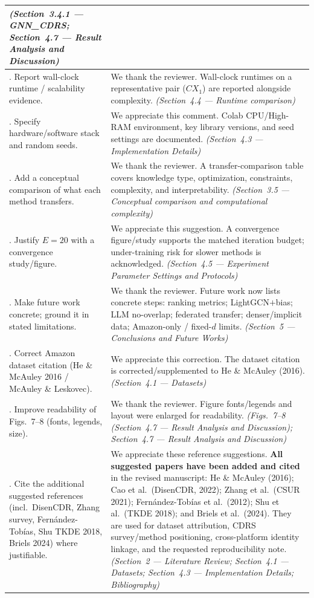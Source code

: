 \documentclass[11pt,a4paper]{article}
\begin{document}
{\begin{longtable}{@{}>{\raggedright\arraybackslash}p{}|>{\raggedright\arraybackslash}p{}@{}}
\textit{(Section~3.4.1 --- GNN\_CDRS; Section~4.7 --- Result Analysis and Discussion)} \\
\midrule
16. Report wall-clock runtime / scalability evidence.
&
We thank the reviewer. Wall-clock runtimes on a representative pair ($CX_1$) are reported alongside complexity.
\textit{(Section~4.4 --- Runtime comparison)} \\
\midrule
17. Specify hardware/software stack and random seeds.
&
We appreciate this comment. Colab CPU/High-RAM environment, key library versions, and seed settings are documented.
\textit{(Section~4.3 --- Implementation Details)} \\
\midrule
18. Add a conceptual comparison of what each method transfers.
&
We thank the reviewer. A transfer-comparison table covers knowledge type, optimization, constraints, complexity, and interpretability.
\textit{(Section~3.5 --- Conceptual comparison and computational complexity)} \\
\midrule
19. Justify $E{=}20$ with a convergence study/figure.
&
We appreciate this suggestion. A convergence figure/study supports the matched iteration budget; under-training risk for slower methods is acknowledged.
\textit{(Section~4.5 --- Experiment Parameter Settings and Protocols)} \\
\midrule
20. Make future work concrete; ground it in stated limitations.
&
We thank the reviewer. Future work now lists concrete steps: ranking metrics; LightGCN$+$bias; LLM no-overlap; federated transfer; denser/implicit data; Amazon-only / fixed-$d$ limits.
\textit{(Section~5 --- Conclusions and Future Works)} \\
\midrule
21. Correct Amazon dataset citation (He \& McAuley 2016 / McAuley \& Leskovec).
&
We appreciate this correction. The dataset citation is corrected/supplemented to He \& McAuley (2016).
\textit{(Section~4.1 --- Datasets)} \\
\midrule
22. Improve readability of Figs.~7--8 (fonts, legends, size).
&
We thank the reviewer. Figure fonts/legends and layout were enlarged for readability.
\textit{(Figs.~7--8 (Section~4.7 --- Result Analysis and Discussion); Section~4.7 --- Result Analysis and Discussion)} \\
\midrule
23. Cite the additional suggested references (incl.\ DisenCDR, Zhang survey, Fern\'andez-Tob\'ias, Shu TKDE 2018, Briels 2024) where justifiable.
&
We appreciate these reference suggestions. \textbf{All suggested papers have been added and cited} in the revised manuscript: He \& McAuley (2016); Cao et al.\ (DisenCDR, 2022); Zhang et al.\ (CSUR 2021); Fern\'andez-Tob\'ias et al.\ (2012); Shu et al.\ (TKDE 2018); and Briels et al.\ (2024). They are used for dataset attribution, CDRS survey/method positioning, cross-platform identity linkage, and the requested reproducibility note.
\textit{(Section~2 --- Literature Review; Section~4.1 --- Datasets; Section~4.3 --- Implementation Details; Bibliography)} \\
\bottomrule
\end{longtable}
}
\end{document}
